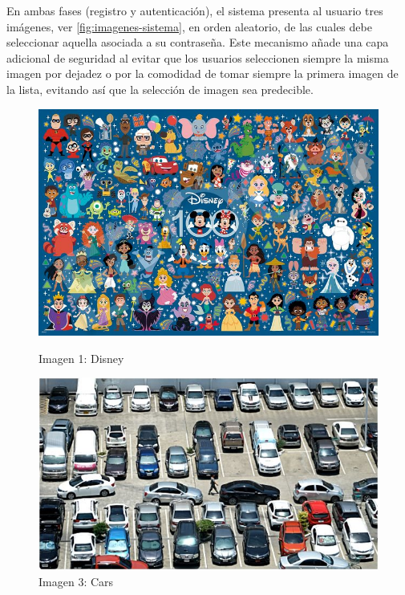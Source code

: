 En ambas fases (registro y autenticación), el sistema presenta al usuario tres imágenes, ver \ref{fig:imagenes-sistema}, en orden aleatorio, de las cuales debe seleccionar aquella asociada a su contraseña. Este mecanismo añade una capa adicional de seguridad al evitar que los usuarios seleccionen siempre la misma imagen por dejadez o por la comodidad de tomar siempre la primera imagen de la lista, evitando as\'i que la selecci\'on de imagen sea predecible. 


\begin{figure}[ht]
	\centering
	\begin{minipage}[b]{0.3\textwidth}
		\centering
		\includegraphics[width=\textwidth]{Graphics/disney.jpeg}
		\caption*{Imagen 1: Disney}
	\end{minipage}
	\hfill
	\begin{minipage}[b]{0.3\textwidth}
		\centering
		\includegraphics[width=\textwidth]{Graphics/cars.jpeg}
		\caption*{Imagen 3: Cars}
	\end{minipage}

\end{figure}
